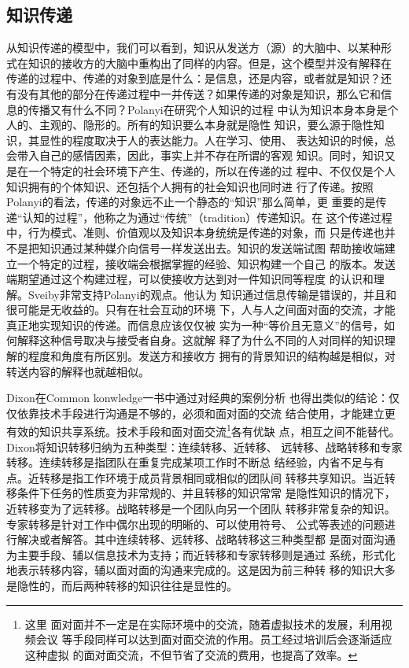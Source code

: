 \documentclass[12pt,a4paper]{ctexart}
\begin{document}
\subsection{知识传递}
从知识传递的模型中，我们可以看到，知识从发送方（源）的大脑中、以某种形
式在知识的接收方的大脑中重构出了同样的内容。但是，这个模型并没有解释在
传递的过程中、传递的对象到底是什么：是信息，还是内容，或者就是知识？还
有没有其他的部分在传递过程中一并传送？如果传递的对象是知识，那么它和信
息的传播又有什么不同？Polanyi\cite{polanyi1998pkt}在研究个人知识的过程
中认为知识本身本身是个人的、主观的、隐形的。所有的知识要么本身就是隐性
知识，要么源于隐性知识，其显性的程度取决于人的表达能力。人在学习、使用、
表达知识的时候，总会带入自己的感情因素，因此，事实上并不存在所谓的客观
知识。同时，知识又是在一个特定的社会环境下产生、传递的，所以在传递的过
程中、不仅仅是个人知识拥有的个体知识、还包括个人拥有的社会知识也同时进
行了传递。按照Polanyi的看法，传递的对象远不止一个静态的“知识”那么简单，更
重要的是传递“认知的过程”，他称之为通过“传统”（tradition）传递知识。在
这个传递过程中，行为模式、准则、价值观以及知识本身统统是传递的对象，而
只是传递也并不是把知识通过某种媒介向信号一样发送出去。知识的发送端试图
帮助接收端建立一个特定的过程，接收端会根据掌握的经验、知识构建一个自己
的版本。发送端期望通过这个构建过程，可以使接收方达到对一件知识同等程度
的认识和理解。Sveiby\cite{sveiby1996tka}非常支持Polanyi的观点。他认为
知识通过信息传输是错误的，并且和很可能是无收益的。只有在社会互动的环境
下，人与人之间面对面的交流，才能真正地实现知识的传递。而信息应该仅仅被
实为一种“等价且无意义”的信号，如何解释这种信号取决与接受者自身。这就解
释了为什么不同的人对同样的知识理解的程度和角度有所区别。发送方和接收方
拥有的背景知识的结构越是相似，对转送内容的解释也就越相似。

Dixon\cite{dixon2000ckc}在Common konwledge一书中通过对经典的案例分析
也得出类似的结论：仅仅依靠技术手段进行沟通是不够的，必须和面对面的交流
结合使用，才能建立更有效的知识共享系统。技术手段和面对面交流\footnote{这里
  面对面并不一定是在实际环境中的交流，随着虚拟技术的发展，利用视频会议
  等手段同样可以达到面对面交流的作用。员工经过培训后会逐渐适应这种虚拟
  的面对面交流，不但节省了交流的费用，也提高了效率。}各有优缺
点，相互之间不能替代。Dixon将知识转移归纳为五种类型：连续转移、近转移、
远转移、战略转移和专家转移。连续转移是指团队在重复完成某项工作时不断总
结经验，内省不足与有点。近转移是指工作环境于成员背景相同或相似的团队间
转移共享知识。当近转移条件下任务的性质变为非常规的、并且转移的知识常常
是隐性知识的情况下，近转移变为了远转移。战略转移是一个团队向另一个团队
转移非常复杂的知识。专家转移是针对工作中偶尔出现的明晰的、可以使用符号、
公式等表述的问题进行解决或者解答。其中连续转移、远转移、战略转移这三种类型都
是面对面沟通为主要手段、辅以信息技术为支持；而近转移和专家转移则是通过
系统，形式化地表示转移内容，辅以面对面的沟通来完成的。这是因为前三种转
移的知识大多是隐性的，而后两种转移的知识往往是显性的。
\end{document}
